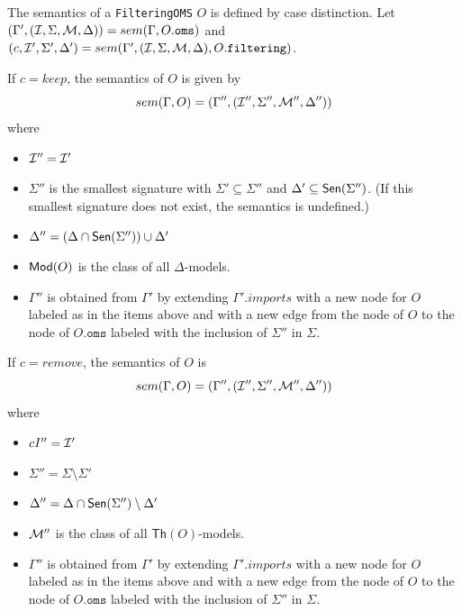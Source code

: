 \documentclass[10pt,fleqn,final]{scrreprt}
\newcommand*{\syntax}[1]{\texttt{#1}}
\renewcommand{\Th}{\mathsf{Th}}
\newenvironment{definitions}[0]{\medskip }{}
\begin{document}
\begin{definitions}
The semantics of a \syntax{FilteringOMS} $O$
is defined by case distinction.
Let
 $(\Gamma',(\cI,\Sigma,\cM, \Delta)) = sem(\Gamma, O.\syntax{oms})$ and
 $(c, \cI',\Sigma',\Delta') = sem(\Gamma', (\cI, \Sigma, \cM, \Delta), O.\syntax{filtering})$.
 
If $c = keep$, 
the semantics of $O$ is given by
$$sem(\Gamma, O) = (\Gamma'',({\cal I}'',\Sigma'',{\cal M}'',\Delta''))$$
\noindent where
\begin{itemize}
  \item ${\cal I}'' = {\cal I}'$
  \item $\Sigma''$ is the smallest signature
with $\Sigma'\subseteq\Sigma''$ and $\Delta'\subseteq\mathsf{Sen}(\Sigma'')$. ({If this smallest signature does not exist, the semantics is undefined.})
  \item $\Delta'' = (\Delta\cap\mathsf{Sen}(\Sigma''))\cup\Delta'$
  \item $\mathsf{Mod}(O)$ is the class of all $\Delta$-models.
  \item $\Gamma''$ is obtained from 
       $\Gamma'$
       by extending $\Gamma'.imports$
       with a new node for $O$ labeled as in the items above and
       with a new edge from the node of $O$ to the node of $O.\syntax{oms}$
        labeled with the inclusion of $\Sigma''$ in $\Sigma$.
\end{itemize}

\noindent
If $c = remove$, the semantics of $O$  
is
$$sem(\Gamma, O) = (\Gamma'',({\cal I}'',\Sigma'',{\cal M}'',\Delta''))$$
\noindent where
\begin{itemize}
  \item $\\cI'' = {\cal I}'$
  \item $\Sigma'' = \Sigma\setminus \Sigma'$ 
  \item $\Delta'' = \Delta\cap\mathsf{Sen}(\Sigma'')\setminus\Delta'$
  \item ${\cal M}''$ is the class of all $\Th(O)$-models.
    \item $\Gamma''$ is obtained from 
       $\Gamma'$
       by extending $\Gamma'.imports$
       with a new node for $O$ labeled as in the items above and
       with a new edge from the node of $O$ to the node of $O.\syntax{oms}$
        labeled with the inclusion of $\Sigma''$ in $\Sigma$.
\end{itemize}



\end{definitions}
\end{document}
